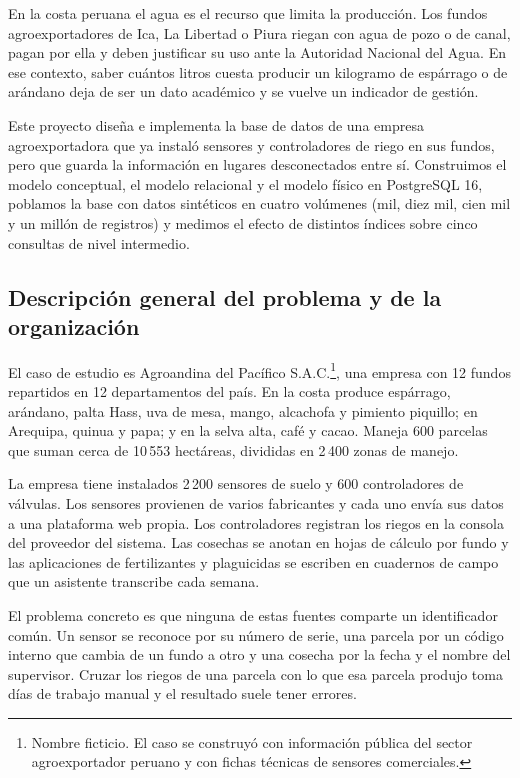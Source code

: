 \documentclass[11pt,letterpaper]{article}
\begin{document}
En la costa peruana el agua es el recurso que limita la producción. Los fundos agroexportadores de Ica, La Libertad o Piura riegan con agua de pozo o de canal, pagan por ella y deben justificar su uso ante la Autoridad Nacional del Agua. En ese contexto, saber cuántos litros cuesta producir un kilogramo de espárrago o de arándano deja de ser un dato académico y se vuelve un indicador de gestión.

Este proyecto diseña e implementa la base de datos de una empresa agroexportadora que ya instaló sensores y controladores de riego en sus fundos, pero que guarda la información en lugares desconectados entre sí. Construimos el modelo conceptual, el modelo relacional y el modelo físico en PostgreSQL 16, poblamos la base con datos sintéticos en cuatro volúmenes (mil, diez mil, cien mil y un millón de registros) y medimos el efecto de distintos índices sobre cinco consultas de nivel intermedio.

\subsection{Descripción general del problema y de la organización}

El caso de estudio es Agroandina del Pacífico S.A.C.\footnote{Nombre ficticio. El caso se construyó con información pública del sector agroexportador peruano y con fichas técnicas de sensores comerciales.}, una empresa con 12 fundos repartidos en 12 departamentos del país. En la costa produce espárrago, arándano, palta Hass, uva de mesa, mango, alcachofa y pimiento piquillo; en Arequipa, quinua y papa; y en la selva alta, café y cacao. Maneja 600 parcelas que suman cerca de 10\,553 hectáreas, divididas en 2\,400 zonas de manejo.

La empresa tiene instalados 2\,200 sensores de suelo y 600 controladores de válvulas. Los sensores provienen de varios fabricantes y cada uno envía sus datos a una plataforma web propia. Los controladores registran los riegos en la consola del proveedor del sistema. Las cosechas se anotan en hojas de cálculo por fundo y las aplicaciones de fertilizantes y plaguicidas se escriben en cuadernos de campo que un asistente transcribe cada semana.

El problema concreto es que ninguna de estas fuentes comparte un identificador común. Un sensor se reconoce por su número de serie, una parcela por un código interno que cambia de un fundo a otro y una cosecha por la fecha y el nombre del supervisor. Cruzar los riegos de una parcela con lo que esa parcela produjo toma días de trabajo manual y el resultado suele tener errores.
\end{document}
